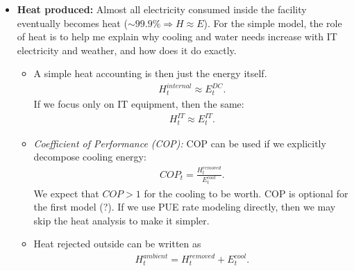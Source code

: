 \documentclass{article}
\begin{document}
\begin{itemize}
    \item \textbf{Heat produced:} Almost all electricity consumed inside the facility eventually becomes heat ($\sim 99.9\% \Rightarrow H\approx E$). For the simple model, the role of heat is to help me explain why cooling and water needs increase with IT electricity and weather, and how does it do exactly.
    \begin{itemize}
        \item {} A simple heat accounting is then just the energy itself.
        \begin{align*}
            H_t^{internal}\approx E_t^{DC}.
        \end{align*}
        If we focus only on IT equipment, then the same:
        \begin{align*}
            H_t^{IT}\approx E_t^{IT}.
        \end{align*}
        \item \textit{Coefficient of Performance (COP):} COP can be used if we explicitly decompose cooling energy:
        \begin{align*}
            COP_t=\frac{H_t^{removed}}{E_t^{cool}}.
        \end{align*}
        We expect that $COP>1$ for the cooling to be worth. COP is optional for the first model (?). If we use PUE rate modeling directly, then we may skip the heat analysis to make it simpler. 
        \item Heat rejected outside can be written as
        \begin{align*}
            H_t^{ambient}=H_t^{removed}+E_t^{cool}.
        \end{align*}
    \end{itemize}


\end{itemize}
\end{document}
